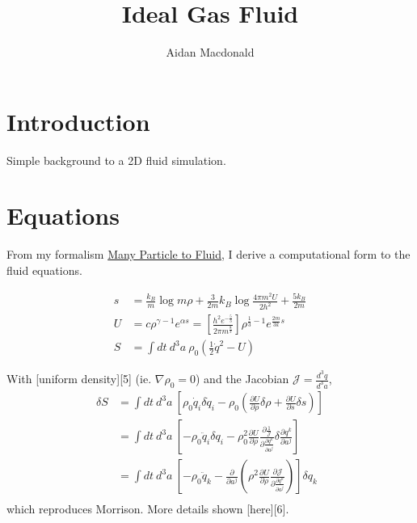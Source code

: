 \documentclass[10pt,a4paper,final]{article}
\author{Aidan Macdonald}
\title{Ideal Gas Fluid}
\begin{document}
\maketitle

\section{Introduction}

Simple background to a 2D fluid simulation.

\section{Equations}

From my formalism \href{https://physics.stackexchange.com/questions/335603/least-action-with-local-equilibrium}{Many Particle to Fluid}, I derive a computational form to the fluid equations. 

\begin{align*}
s &= \frac{k_B}{m} \log m \rho + \frac{3}{2m} k_B \log \frac{4 \pi m^2 U}{2 h^2} + \frac{5 k_B}{2m} \\
U &= c \rho^{\gamma - 1} e^{\alpha s} = \left[\frac{h^{2} e^{- \frac{5}{3}}}{2 \pi m^{\frac{8}{3}}} \right] \rho^{\frac{1}{3}-1} e^{\frac{2 m}{3 k}s}\\
S &= \int dt\ d^3a\ \rho_0 \left( \frac{1}{2} \dot{q}^2 - U \right)
\end{align*}

With [uniform density][5] (ie. $ \nabla \rho_0 = 0 $) and the Jacobian $ \mathcal{J} = \frac{d^3q}{d^3a} $,
\begin{align*}
\delta S &= \int dt\ d^3a\ \left[ \rho_0 \dot{q}_i \delta \dot{q}_i - \rho_0 \left( \frac{\partial U}{\partial \rho} \delta \rho + \frac{\partial U}{\partial s} \delta s \right) \right] \\
  &= \int dt\ d^3a\ \left[ -\rho_0 \ddot{q}_i \delta q_i - \rho_0^2  \frac{\partial U}{\partial \rho} \frac{\partial \frac{1}{\mathcal{J}}}{\partial \frac{\partial q^k}{\partial a^j}} \delta \frac{\partial q^k}{\partial a^j} \right] \\
  &= \int dt\ d^3a\ \left[ -\rho_0 \ddot{q}_k - \frac{\partial}{\partial a^j} \left( \rho^2 \frac{\partial U}{\partial \rho} \frac{\partial \mathcal{J}}{\partial \frac{\partial q^k}{\partial a^j}} \right) \right] \delta q_k \\
\end{align*}
which reproduces Morrison. More details shown [here][6].
\end{document}
